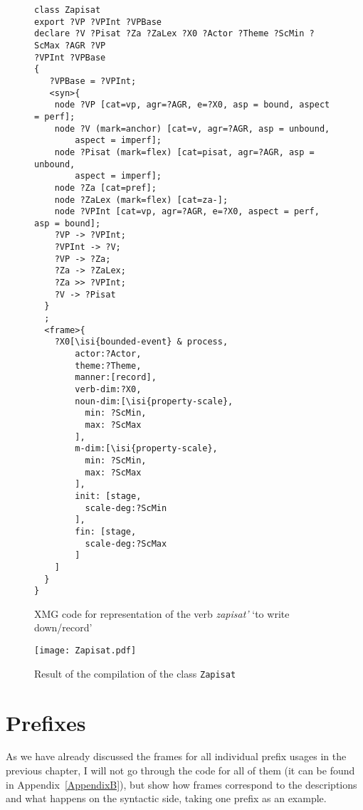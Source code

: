  \begin{figure}
\begin{lstlisting}[style=xmg,basicstyle=\footnotesize\ttfamily]
class Zapisat
export ?VP ?VPInt ?VPBase
declare ?V ?Pisat ?Za ?ZaLex ?X0 ?Actor ?Theme ?ScMin ?ScMax ?AGR ?VP 
?VPInt ?VPBase
{
   ?VPBase = ?VPInt;
   <syn>{
    node ?VP [cat=vp, agr=?AGR, e=?X0, asp = bound, aspect = perf];
    node ?V (mark=anchor) [cat=v, agr=?AGR, asp = unbound, 
    	aspect = imperf];
    node ?Pisat (mark=flex) [cat=pisat, agr=?AGR, asp = unbound, 
    	aspect = imperf];
    node ?Za [cat=pref];
    node ?ZaLex (mark=flex) [cat=za-];
    node ?VPInt [cat=vp, agr=?AGR, e=?X0, aspect = perf, asp = bound];
    ?VP -> ?VPInt;
    ?VPInt -> ?V;
    ?VP -> ?Za;
    ?Za -> ?ZaLex;
    ?Za >> ?VPInt;
    ?V -> ?Pisat
  }
  ;
  <frame>{
    ?X0[\isi{bounded-event} & process,
        actor:?Actor,
        theme:?Theme,
        manner:[record],
        verb-dim:?X0,
        noun-dim:[\isi{property-scale},
          min: ?ScMin,
          max: ?ScMax
        ],
        m-dim:[\isi{property-scale},
          min: ?ScMin,
          max: ?ScMax
        ],
        init: [stage, 
          scale-deg:?ScMin
        ],
        fin: [stage, 
          scale-deg:?ScMax
        ]
    ]
  }
}

\end{lstlisting}
\caption{XMG code for representation of the verb \textit{zapisat'} `to write down/record' \label{xmg:zapisat}}
\end{figure}

\begin{sidewaysfigure}
\texttt{[image: Zapisat.pdf]}
\caption{Result of the compilation of the class \texttt{Zapisat}\label{fig:zapisat}}
\end{sidewaysfigure}

\section{Prefixes}
As we have already discussed the frames for all individual prefix usages in the previous chapter, I will not go through the code for all of them (it can be found in Appendix~\ref{AppendixB}), but show how frames correspond to the  descriptions and what happens on the syntactic side, taking one prefix as an example.

